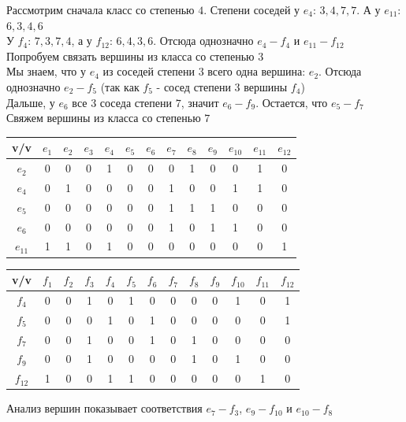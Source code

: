 \documentclass[a4paper,12pt]{article}
\begin{document}
\noindent
Рассмотрим сначала класс со степенью $4$. Степени соседей у $e_4$: $3, 4, 7, 7$. А у $e_{11}$: $6,3,4,6$ \\
У $f_4$: $7, 3, 7, 4$, а у $f_{12}$: $6, 4, 3, 6$. Отсюда однозначно $e_4 - f_4$ и $e_{11} - f_{12}$ \\

\noindent
Попробуем связать вершины из класса со степенью $3$ \\
Мы знаем, что у $e_4$ из соседей степени $3$ всего одна вершина: $e_2$. Отсюда однозначно $e_2 - f_5$ (так как $f_5$ - сосед степени $3$ вершины $f_4$) \\
Дальше, у $e_6$ все 3 соседа степени $7$, значит $e_6 - f_9$. Остается, что $e_5 - f_7$ \\

\noindent
Свяжем вершины из класса со степенью $7$ \\
\begin{table}[H]
    \centering
    \begin{tabular}{|c|c|c|c|c|c|c|c|c|c|c|c|c|}
    \hline
        v/v & $e_1$ & $e_2$ & $e_3$ & $e_4$ & $e_5$ & $e_6$ & $e_7$ & $e_8$ & $e_9$ & $e_{10}$ & $e_{11}$ & $e_{12}$ \\ \hline
        $e_2$ & 0 & 0 & 0 & 1 & 0 & 0 & 0 & 1 & 0 & 0 & 1 & 0 \\ \hline
        $e_4$ & 0 & 1 & 0 & 0 & 0 & 0 & 1 & 0 & 0 & 1 & 1 & 0 \\ \hline
        $e_5$ & 0 & 0 & 0 & 0 & 0 & 0 & 1 & 1 & 1 & 0 & 0 & 0 \\ \hline
        $e_6$ & 0 & 0 & 0 & 0 & 0 & 0 & 1 & 0 & 1 & 1 & 0 & 0 \\ \hline
        $e_{11}$ & 1 & 1 & 0 & 1 & 0 & 0 & 0 & 0 & 0 & 0 & 0 & 1 \\ \hline
    \end{tabular}
\end{table}

\begin{table}[H]
    \centering
    \begin{tabular}{|c|c|c|c|c|c|c|c|c|c|c|c|c|}
    \hline
        v/v & $f_1$ & $f_2$ & $f_3$ & $f_4$ & $f_5$ & $f_6$ & $f_7$ & $f_8$ & $f_9$ & $f_{10}$ & $f_{11}$ & $f_{12}$ \\ \hline
        $f_4$ & 0 & 0 & 1 & 0 & 1 & 0 & 0 & 0 & 0 & 1 & 0 & 1 \\ \hline
        $f_5$ & 0 & 0 & 0 & 1 & 0 & 1 & 0 & 0 & 0 & 0 & 0 & 1 \\ \hline
        $f_7$ & 0 & 0 & 1 & 0 & 0 & 1 & 0 & 1 & 0 & 0 & 0 & 0 \\ \hline
        $f_9$ & 0 & 0 & 1 & 0 & 0 & 0 & 0 & 1 & 0 & 1 & 0 & 0 \\ \hline
        $f_{12}$ & 1 & 0 & 0 & 1 & 1 & 0 & 0 & 0 & 0 & 0 & 1 & 0 \\ \hline
    \end{tabular}
\end{table}
\noindent
Анализ вершин показывает соответствия $e_7 - f_3$, $e_9 - f_{10}$ и $e_{10} - f_8$ \\
\end{document}
